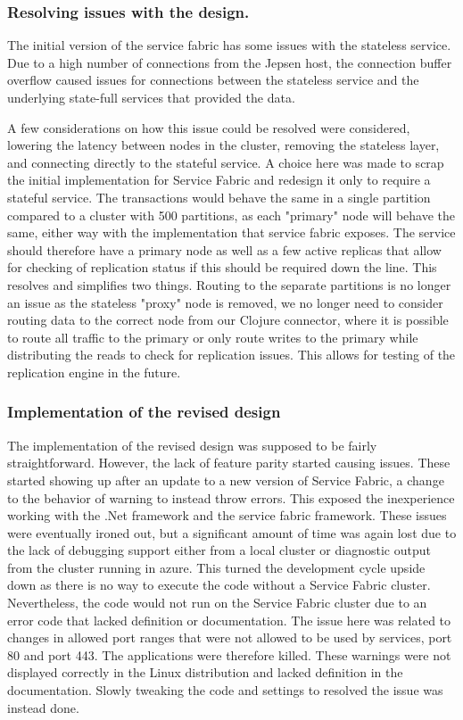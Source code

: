 \documentclass[a4paper,10pt,titlepage]{report}
\begin{document}
\subsubsection{Resolving issues with the design.}
   

The initial version of the service fabric has some issues with the stateless service. Due to a high number of connections from the Jepsen host, the connection buffer overflow caused issues for connections between the stateless service and the underlying state-full services that provided the data.

A few considerations on how this issue could be resolved were considered, lowering the latency between nodes in the cluster, removing the stateless layer, and connecting directly to the stateful service. A choice here was made to scrap the initial implementation for Service Fabric and redesign it only to require a stateful service. The transactions would behave the same in a  single partition compared to a cluster with 500 partitions, as each "primary" node will behave the same, either way with the implementation that service fabric exposes. The service should therefore have a primary node as well as a few active replicas that allow for checking of replication status if this should be required down the line. This resolves and simplifies two things. Routing to the separate partitions is no longer an issue as the stateless "proxy" node is removed, we no longer need to consider routing data to the correct node from our Clojure connector, where it is possible to route all traffic to the primary or only route writes to the primary while distributing the reads to check for replication issues. This allows for testing of the replication engine in the future.

\subsubsection{Implementation of the revised design}

The implementation of the revised design was supposed to be fairly straightforward. However, the lack of feature parity started causing issues. These started showing up after an update to a new version of Service Fabric, a change to the behavior of warning to instead throw errors. This exposed the inexperience working with the .Net framework and the service fabric framework. These issues were eventually ironed out, but a significant amount of time was again lost due to the lack of debugging support either from a local cluster or diagnostic output from the cluster running in azure. This turned the development cycle upside down as there is no way to execute the code without a Service Fabric cluster.
\\ \vspace{5mm}
Nevertheless, the code would not run on the Service Fabric cluster due to an error code that lacked definition or documentation. The issue here was related to changes in allowed port ranges that were not allowed to be used by services, port 80 and port 443. The applications were therefore killed. These warnings were not displayed correctly in the Linux distribution and lacked definition in the documentation. Slowly tweaking the code and settings to resolved the issue was instead done.
\end{document}
